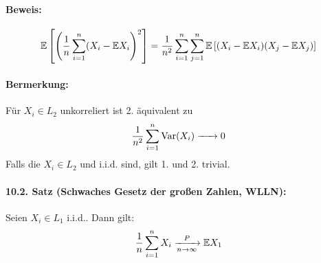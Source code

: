 \documentclass[11pt]{report}
\begin{document}
\paragraph{Beweis:} 
\begin{equation*}
    \mathbb{E}\left[\left(\dfrac{1}{n}\sum_{i=1}^n(X_i-\mathbb{E} X_i\right)^2\right]=\dfrac{1}{n^2}\sum_{i=1}^n\sum_{j=1}^n\mathbb{E}\left[(X_i-\mathbb{E} X_i)(X_j-\mathbb{E} X_j)\right]
\end{equation*}


\paragraph{Bermerkung:} F\"ur $X_i\in L_2$ unkorreliert ist 2. \"aquivalent zu $$\dfrac{1}{n^2}\sum_{i=1}^n\Var(X_i)\nto{}{}0$$ Falls die $X_i\in L_2$ und i.i.d. sind, gilt 1. und 2. trivial.


\paragraph{10.2. Satz (Schwaches Gesetz der gro\ss{}en Zahlen, WLLN):} Seien $X_i\in L_1$ i.i.d.. Dann gilt: 
    $$\dfrac{1}{n}\sum_{i=1}^nX_i\nto{P}{n\to\infty}\E X_1$$ 
\end{document}
